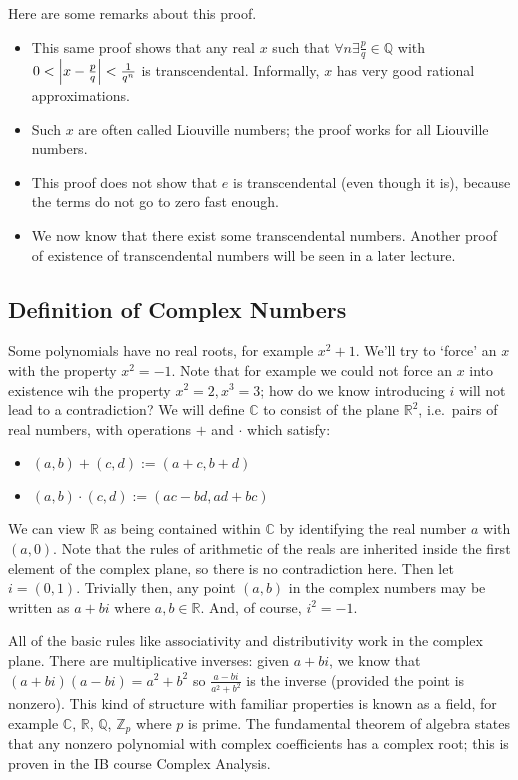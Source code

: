 Here are some remarks about this proof.
\begin{itemize}
	\item This same proof shows that any real \(x\) such that \(\forall n \exists \frac{p}{q}\in \mathbb Q\) with \(0 < \abs{x - \frac{p}{q}} < \frac{1}{q^n}\) is transcendental. Informally, \(x\) has very good rational approximations.
	\item Such \(x\) are often called Liouville numbers; the proof works for all Liouville numbers.
	\item This proof does not show that \(e\) is transcendental (even though it is), because the terms do not go to zero fast enough.
	\item We now know that there exist some transcendental numbers. Another proof of existence of transcendental numbers will be seen in a later lecture.
\end{itemize}

\subsection{Definition of Complex Numbers}
Some polynomials have no real roots, for example \(x^2 + 1\). We'll try to `force' an \(x\) with the property \(x^2 = -1\). Note that for example we could not force an \(x\) into existence wih the property \(x^2=2, x^3=3\); how do we know introducing \(i\) will not lead to a contradiction? We will define \(\mathbb C\) to consist of the plane \(\mathbb R^2\), i.e.\ pairs of real numbers, with operations \(+\) and \(\cdot\) which satisfy:
\begin{itemize}
	\item \((a,b)+(c,d) := (a+c, b+d)\)
	\item \((a,b)\cdot(c,d) := (ac-bd, ad+bc)\)
\end{itemize}
We can view \(\mathbb R\) as being contained within \(\mathbb C\) by identifying the real number \(a\) with \((a, 0)\). Note that the rules of arithmetic of the reals are inherited inside the first element of the complex plane, so there is no contradiction here. Then let \(i=(0,1)\). Trivially then, any point \((a, b)\) in the complex numbers may be written as \(a+bi\) where \(a, b \in \mathbb R\). And, of course, \(i^2 = -1\).

All of the basic rules like associativity and distributivity work in the complex plane. There are multiplicative inverses: given \(a+bi\), we know that \((a+bi)(a-bi) = a^2 + b^2\) so \(\frac{a-bi}{a^2 + b^2}\) is the inverse (provided the point is nonzero). This kind of structure with familiar properties is known as a field, for example \(\mathbb C\), \(\mathbb R\), \(\mathbb Q\), \(\mathbb Z_p\) where \(p\) is prime. The fundamental theorem of algebra states that any nonzero polynomial with complex coefficients has a complex root; this is proven in the IB course Complex Analysis.
